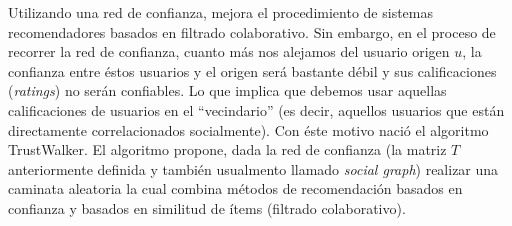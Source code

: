 			Utilizando una red de confianza, mejora el procedimiento de sistemas recomendadores basados en filtrado colaborativo. Sin embargo, en el proceso de recorrer la red de confianza, cuanto más nos alejamos del usuario origen $u$, la confianza entre éstos usuarios y el origen será bastante débil y sus calificaciones (\textit{ratings}) no serán confiables. Lo que implica que debemos usar aquellas calificaciones de usuarios en el \enquote{vecindario} (es decir, aquellos usuarios que están directamente correlacionados socialmente). Con éste motivo nació el algoritmo TrustWalker. El algoritmo propone, dada la red de confianza (la matriz $T$ anteriormente definida y también usualmento llamado \textit{social graph}) realizar una caminata aleatoria la cual combina métodos de recomendación basados en confianza y basados en similitud de ítems (filtrado colaborativo).
			
